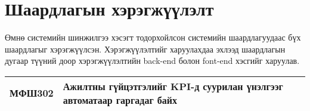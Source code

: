 \section{Шаардлагын хэрэгжүүлэлт}

Өмнө системийн шинжилгээ хэсэгт тодорхойлсон системийн шаардлагуудаас бүх шаардлагыг
хэрэгжүүлсэн. Хэрэгжүүлэлтийг харуулахдаа эхлээд шаардлагын дугаар түүний доор хэрэгжүүлэлтийн
back-end болон font-end хэсгийг харуулав.

\begin{table}[H]
    \centering
    \label{my-label-3}
    \begin{tabular}{|p{1.7cm}|p{12cm}|}
        \hline
          МФШ302 & Ажилтны гүйцэтгэлийг KPI-д суурилан үнэлгээг автоматаар гаргадаг байх\\\hline
    \end{tabular}
\end{table}

